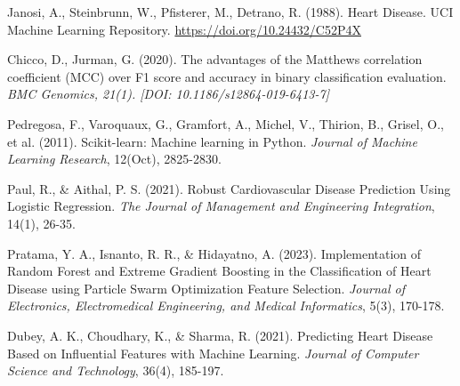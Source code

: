 \documentclass{article}
\begin{document}
\begin{thebibliography}{99}

    Janosi, A., Steinbrunn, W., Pfisterer, M., Detrano, R. (1988). Heart Disease. UCI Machine Learning Repository. \url{https://doi.org/10.24432/C52P4X}

    Chicco, D., Jurman, G. (2020). The advantages of the Matthews correlation coefficient (MCC) over F1 score and accuracy in binary classification evaluation. \textit{BMC Genomics, 21(1). [DOI: 10.1186/s12864-019-6413-7]}

    Pedregosa, F., Varoquaux, G., Gramfort, A., Michel, V., Thirion, B., Grisel, O., et al. (2011). Scikit-learn: Machine learning in Python. \textit{Journal of Machine Learning Research}, 12(Oct), 2825-2830.

    Paul, R., \& Aithal, P. S. (2021). Robust Cardiovascular Disease Prediction Using Logistic Regression. \textit{The Journal of Management and Engineering Integration}, 14(1), 26-35.

    Pratama, Y. A., Isnanto, R. R., \& Hidayatno, A. (2023). Implementation of Random Forest and Extreme Gradient Boosting in the Classification of Heart Disease using Particle Swarm Optimization Feature Selection. \textit{Journal of Electronics, Electromedical Engineering, and Medical Informatics}, 5(3), 170-178.

    Dubey, A. K., Choudhary, K., \& Sharma, R. (2021). Predicting Heart Disease Based on Influential Features with Machine Learning. \textit{Journal of Computer Science and Technology}, 36(4), 185-197.

\end{thebibliography}
\end{document}

